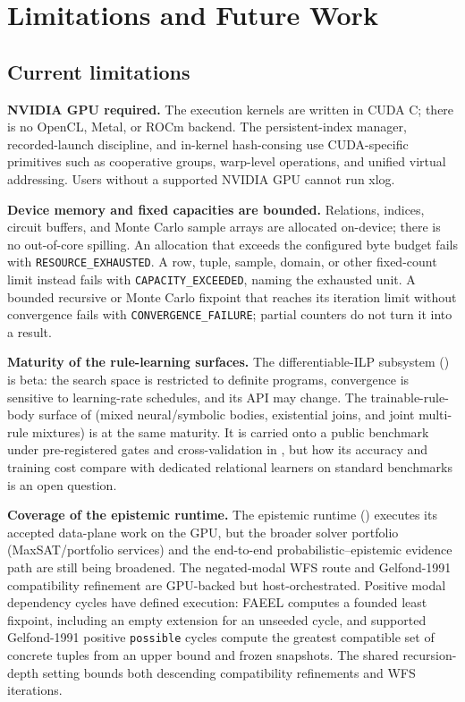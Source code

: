 \section{Limitations and Future Work}\label{sec:limits}

\subsection{Current limitations}

\textbf{NVIDIA GPU required.} The execution kernels are written in CUDA C; there is no OpenCL, Metal, or ROCm backend. The persistent-index manager, recorded-launch discipline, and in-kernel hash-consing use CUDA-specific primitives such as cooperative groups, warp-level operations, and unified virtual addressing. Users without a supported NVIDIA GPU cannot run xlog.

\textbf{Device memory and fixed capacities are bounded.} Relations, indices, circuit buffers, and Monte Carlo sample arrays are allocated on-device; there is no out-of-core spilling. An allocation that exceeds the configured byte budget fails with \texttt{RESOURCE\_EXHAUSTED}. A row, tuple, sample, domain, or other fixed-count limit instead fails with \texttt{CAPACITY\_EXCEEDED}, naming the exhausted unit. A bounded recursive or Monte Carlo fixpoint that reaches its iteration limit without convergence fails with \texttt{CONVERGENCE\_FAILURE}; partial counters do not turn it into a result.

\textbf{Maturity of the rule-learning surfaces.} The differentiable-ILP subsystem () is beta: the search space is restricted to definite programs, convergence is sensitive to learning-rate schedules, and its API may change. The trainable-rule-body surface of  (mixed neural/symbolic bodies, existential joins, and joint multi-rule mixtures) is at the same maturity. It is carried onto a public benchmark under pre-registered gates and cross-validation in , but how its accuracy and training cost compare with dedicated relational learners on standard benchmarks is an open question.

\textbf{Coverage of the epistemic runtime.} The epistemic runtime () executes its accepted data-plane work on the GPU, but the broader solver portfolio (MaxSAT/portfolio services) and the end-to-end probabilistic--epistemic evidence path are still being broadened. The negated-modal WFS route and Gelfond-1991 compatibility refinement are GPU-backed but host-orchestrated. Positive modal dependency cycles have defined execution: FAEEL computes a founded least fixpoint, including an empty extension for an unseeded cycle, and supported Gelfond-1991 positive \texttt{possible} cycles compute the greatest compatible set of concrete tuples from an upper bound and frozen snapshots. The shared recursion-depth setting bounds both descending compatibility refinements and WFS iterations.

